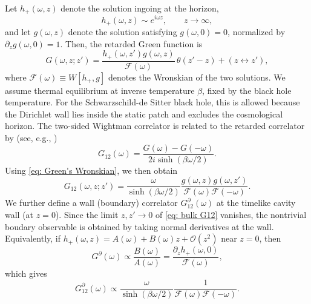 \documentclass[prd,aps,twocolumn,amsfonts,showpacs,superscriptaddress,preprintnumbers,nofootinbib]{revtex4-2}
\begin{document}
Let $h_+(\omega,z)$ denote the solution ingoing at the horizon,
\begin{equation}
    h_+(\omega,z)\sim e^{ i\omega z},\qquad z\to\infty,
\end{equation}
and let $g(\omega,z)$ denote the solution satisfying $g(\omega,0)=0$, normalized by $\partial_z g(\omega,0)=1$. Then, the retarded Green function is
\begin{equation}
\label{eq: Green's Wronskian}
    G(\omega,z;z')
    = \frac{h_+(\omega,z')g(\omega,z)}{\mathcal{F}(\omega)}\,\theta(z'-z)
    + (z \leftrightarrow z'),
\end{equation}
where $\mathcal{F}(\omega)\equiv W[h_+,g]$ denotes the Wronskian of the two solutions. We assume thermal equilibrium at inverse temperature $\beta$, fixed by the black hole temperature. For the Schwarzschild-de Sitter black hole, this is allowed because the Dirichlet wall lies inside the static patch and excludes the cosmological horizon. The two-sided Wightman correlator is related to the retarded correlator by (see, e.g., \cite{Dodelson:2023vrw,Grozdanov:2025ulc})
\begin{equation}
\label{eq: G12 relation}
    G_{12}(\omega) = \frac{G(\omega)-G(-\omega)}
    {2i\sinh(\beta\omega/2)} .
\end{equation}
Using \eqref{eq: Green's Wronskian}, we then obtain
\begin{equation}
\label{eq: bulk G12}
    G_{12}(\omega,z;z') = \frac{\omega}{\sinh(\beta\omega/2)}
    \frac{g(\omega,z)g(\omega,z')}
    {\mathcal{F}(\omega)\mathcal{F}(-\omega)} .
\end{equation}
We further define a wall (boundary) correlator $G_{12}^{\partial}(\omega)$ at the timelike cavity wall (at $z=0$). Since the limit $z, z' \to 0$ of \eqref{eq: bulk G12} vanishes, the nontrivial boudary observable is obtained by taking normal derivatives at the wall. Equivalently, if
$h_+(\omega,z)=A(\omega)+B(\omega)z+\mathcal{O}(z^2)$ near $z=0$, then
\begin{equation}
    G^\partial(\omega)
    \propto
    \frac{B(\omega)}{A(\omega)}
    =\frac{\partial_z h_+(\omega,0)}{\mathcal{F}(\omega)} ,
\end{equation}
which gives
\begin{equation}
\label{eq: boundary G12}
    G_{12}^{\partial}(\omega)
    \propto
    \frac{\omega}{\sinh(\beta\omega/2)}
    \frac{1}{\mathcal{F}(\omega)\mathcal{F}(-\omega)} .
\end{equation}
\end{document}
